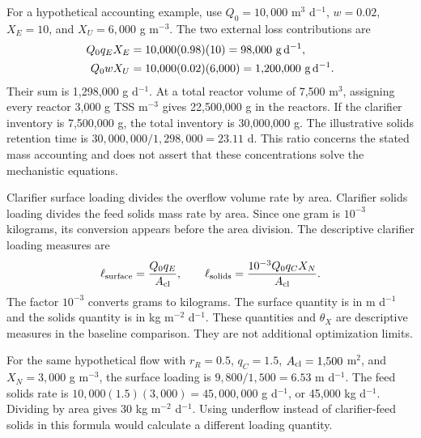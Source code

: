 For a hypothetical accounting example, use $Q_0=10{,}000$ m$^3$ d$^{-1}$, $w=0.02$, $X_E=10$, and $X_U=6{,}000$ g m$^{-3}$. The two external loss contributions are
\begin{align}
\equationname{Illustrative effluent solids-loss calculation}
Q_0q_EX_E&=10{,}000(0.98)(10)=98{,}000\ \mathrm{g\,d^{-1}},\\
\equationname{Illustrative waste-sludge solids-loss calculation}
Q_0wX_U&=10{,}000(0.02)(6{,}000)=1{,}200{,}000\ \mathrm{g\,d^{-1}}.
\end{align}
Their sum is 1{,}298{,}000 g d$^{-1}$. At a total reactor volume of 7{,}500 m$^3$, assigning every reactor 3{,}000 g TSS m$^{-3}$ gives 22{,}500{,}000 g in the reactors. If the clarifier inventory is 7{,}500{,}000 g, the total inventory is 30{,}000{,}000 g. The illustrative solids retention time is $30{,}000{,}000/1{,}298{,}000=23.11$ d. This ratio concerns the stated mass accounting and does not assert that these concentrations solve the mechanistic equations.

Clarifier surface loading divides the overflow volume rate by area. Clarifier solids loading divides the feed solids mass rate by area. Since one gram is $10^{-3}$ kilograms, its conversion appears before the area division. The descriptive clarifier loading measures are
\begin{equation}
\equationname{Clarifier surface and solids loading measures}
\ell_{\rm surface}=\frac{Q_0q_E}{A_{\rm cl}},\qquad
\ell_{\rm solids}=\frac{10^{-3}Q_0q_CX_N}{A_{\rm cl}}.
\label{eq:plant_loading_measures}
\end{equation}
The factor $10^{-3}$ converts grams to kilograms. The surface quantity is in m d$^{-1}$ and the solids quantity is in kg m$^{-2}$ d$^{-1}$. These quantities and $\theta_X$ are descriptive measures in the baseline comparison. They are not additional optimization limits.

For the same hypothetical flow with $r_R=0.5$, $q_C=1.5$, $A_{\rm cl}=1{,}500$ m$^2$, and $X_N=3{,}000$ g m$^{-3}$, the surface loading is $9{,}800/1{,}500=6.53$ m d$^{-1}$. The feed solids rate is $10{,}000(1.5)(3{,}000)=45{,}000{,}000$ g d$^{-1}$, or 45{,}000 kg d$^{-1}$. Dividing by area gives 30 kg m$^{-2}$ d$^{-1}$. Using underflow instead of clarifier-feed solids in this formula would calculate a different loading quantity.

